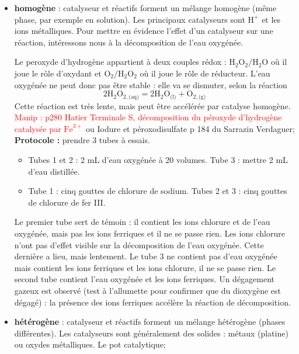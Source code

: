\documentclass[11pt,a4paper]{report}
\begin{document}
	\begin{itemize}
	\item \textbf{homogène} : catalyseur et réactifs forment un mélange homogène (même phase, par exemple en solution). Les principaux catalyseurs sont $\text{H}^+$ et les ions métalliques. Pour mettre en évidence l'effet d'un catalyseur sur une réaction, intéressons nous à la décomposition de l'eau oxygénée.
	
	Le peroxyde d'hydrogène appartient à deux couples rédox : $\text{H}_2\text{O}_2/\text{H}_2\text{O}$ où il joue le rôle d'oxydant et $\text{O}_2/\text{H}_2\text{O}_2$ où il joue le rôle de réducteur. L'eau oxygénée ne peut donc pas être stable : elle va se dismuter, selon la réaction
	\begin{equation}
		2\text{H}_2\text{O}_{2,\text{(aq)}} 
		= 2\text{H}_2\text{O}_\text{(l)} + \text{O}_{2,\text{(g)}}
	\end{equation}
	Cette réaction est très lente, mais peut être accélérée par catalyse homogène. 
	\textcolor{red}{Manip : p280 Hatier Terminale S, décomposition du péroxyde d'hydrogène 					catalysée par $\text{Fe}^{3+}$} ou Iodure et péroxodisulfate p 184 du Sarrazin Verdaguer;\\

	\textbf{Protocole :} prendre 3 tubes à essais. 
	\begin{itemize}
		\item Tubes 1 et 2 : 2 mL d'eau oxygénée à 20 volumes. Tube 3 : mettre 2 mL d'eau distillée.
		\item Tube 1 : cinq gouttes de chlorure de sodium. Tubes 2 et 3 : cinq gouttes de chlorure 					de fer III.
	\end{itemize}
	Le premier tube sert de témoin : il contient les ions chlorure et de l'eau oxygénée, mais pas 	les ions ferriques et il ne se passe rien. Les ions chlorure n'ont pas d'effet visible sur la 		décomposition de l'eau oxygénée. Cette dernière a lieu, mais lentement. Le tube 3 ne contient pas d'eau oxygénée mais contient les ions 	ferriques et les ions chlorure, il ne se passe rien. Le second tube contient l'eau oxygénée et les ions ferriques. Un dégagement gazeux est observé (test à l'allumette pour confirmer que du dioxygène est dégagé) : la présence des ions ferriques 		accélère la réaction de décomposition.\\  
		
	\item \textbf{hétérogène} : catalyseur et réactifs forment un mélange hétérogène (phases 		différentes). Les catalyseurs sont généralement des solides : métaux (platine) ou oxydes 		métalliques. Le pot catalytique;\\
	

\end{itemize}
\end{document}
